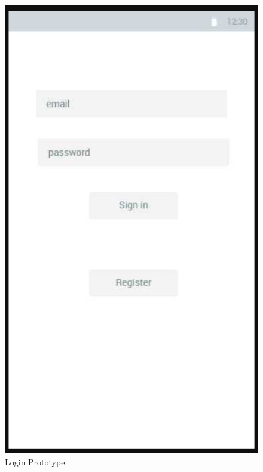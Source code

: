 \begin{figure}[h!]
\begin{minipage}[t]{0.48\textwidth}
\includegraphics[width=\linewidth,keepaspectratio=true]{img/login_mock.PNG}
\caption{Login Prototype}
\label{fig:Login Prototype}
\end{minipage}
\hspace*{\fill} %
\begin{minipage}[t]{0.48\textwidth}

\end{minipage}
\end{figure}
